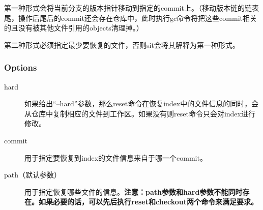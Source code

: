 \documentclass[11pt, a4paper, UTF8]{ctexart}
\begin{document}
第一种形式会将当前分支的版本指针移动到指定的commit上。（移动版本链的链表尾，操作后尾后的commit还会存在仓库中，此时执行gc命令将把这些commit相关的且没有被其他文件引用的objects清理掉。）

第二种形式必须指定最少要恢复的文件，否则sit会将其解释为第一种形式。
\subsubsection{Options}
\begin{description}
	\item[\YaHeiMono hard] 如果给出``--hard''参数，那么reset命令在恢复index中的文件信息的同时，会从仓库中复制相应的文件到工作区。如果没有则reset命令只会对index进行修改。
	\item[\YaHeiMono commit] 用于指定要恢复到index的文件信息来自于哪一个commit。
	\item[\YaHeiMono path（默认参数）] 用于指定恢复哪些文件的信息。\textbf{注意：path参数和hard参数不能同时存在。如果必要的话，可以先后执行reset和checkout两个命令来满足要求。}
\end{description}

\end{document}
